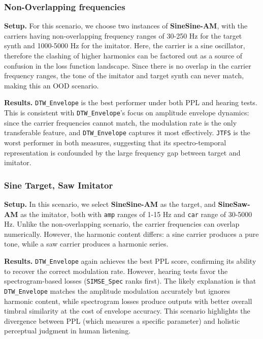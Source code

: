 \documentclass[10pt]{article} %
\newcommand{\SIMSESpec}{\texttt{SIMSE\_\allowbreak Spec}\xspace}
\newcommand{\JTFS}{\texttt{JTFS}\xspace}
\newcommand{\DTWEnv}{\texttt{DTW\_\allowbreak Envelope}\xspace}
\newcommand{\FMMod}{\textbf{SineSaw-AM}\xspace}
\newcommand{\FMModvtwo}{\textbf{SineSine-AM}\xspace}
\begin{document}

\subsubsection{Non-Overlapping frequencies}
\label{sec:am_sound_matching_nonoverlapping}
\textbf{Setup.} For this scenario, we choose two instances of \FMModvtwo, with the carriers having non-overlapping frequency ranges of 30-250 Hz for the target synth and 1000-5000 Hz for the imitator. Here, the carrier is a sine oscillator, therefore the clashing of higher harmonics can be factored out as a source of confusion in the loss function landscape. Since there is no overlap in the carrier frequency ranges, the tone of the imitator and target synth can never match, making this an OOD scenario. 

\noindent \textbf{Results.}
\DTWEnv is the best performer under both PPL and hearing tests. This is consistent with \DTWEnv's focus on amplitude envelope dynamics: since the carrier frequencies cannot match, the modulation rate is the only transferable feature, and \DTWEnv captures it most effectively. \JTFS is the worst performer in both measures, suggesting that its spectro-temporal representation is confounded by the large frequency gap between target and imitator.



\subsubsection{Sine Target, Saw Imitator}
\label{sec:am_sinetarget_sawimitate}
\textbf{Setup.} In this scenario, we select \FMModvtwo as the target, and \FMMod as the imitator, both with \texttt{amp} ranges of 1-15 Hz and \texttt{car} range of 30-5000 Hz. Unlike the non-overlapping scenario, the carrier frequencies can overlap numerically. However, the harmonic content differs: a sine carrier produces a pure tone, while a saw carrier produces a harmonic series.

\noindent \textbf{Results.} \DTWEnv again achieves the best PPL score, confirming its ability to recover the correct modulation rate. However, hearing tests favor the spectrogram-based losses (\SIMSESpec ranks first). The likely explanation is that \DTWEnv  matches the amplitude modulation accurately but ignores harmonic content, while spectrogram losses produce outputs with better overall timbral similarity at the cost of envelope accuracy. This scenario highlights the divergence between PPL (which measures a specific parameter) and holistic perceptual judgment in human listening.
\end{document}
